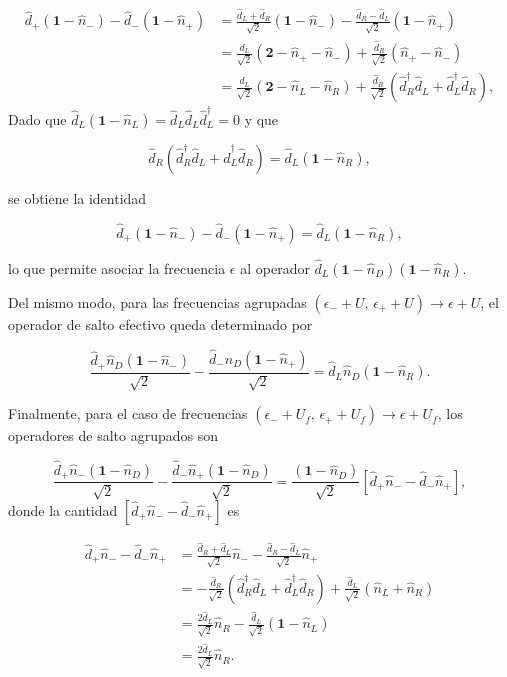 \begin{appendixs}
\begin{align*}
    \hat{d}_{+}(\textbf{1}-\hat{n}_{-}) - \hat{d}_{-}(\textbf{1}-\hat{n}_{+}) & = \frac{\hat{d}_{L} + \hat{d}_{R}}{\sqrt{2}} (\textbf{1} - \hat{n}_{-}) - \frac{\hat{d}_{R} - \hat{d}_{L}}{\sqrt{2}}(\textbf{1}-\hat{n}_{+}) \\
    & = \frac{\hat{d}_{L}}{\sqrt{2}}(\textbf{2} - \hat{n}_{+} -\hat{n}_{-} ) + \frac{\hat{d}_{R}}{\sqrt{2}}(\hat{n}_{+} -\hat{n}_{-}) \\
    & = \frac{\hat{d}_{L}}{\sqrt{2}}(\textbf{2}-\hat{n}_{L} -\hat{n}_{R}) + \frac{\hat{d}_{R}}{\sqrt{2}}(\hat{d}^{\dagger}_{R}\hat{d}_{L}+\hat{d}^{\dagger}_{L}\hat{d}_{R}),
\end{align*}
Dado que $\hat{d}_{L}(\mathbf{1} - \hat{n}_{L}) = \hat{d}_{L}\hat{d}_{L}\hat{d}^{\dagger}_{L} = 0$ y que 

\[
\hat{d}_{R}(\hat{d}^{\dagger}_{R}\hat{d}_{L} + \hat{d}^{\dagger}_{L}\hat{d}_{R}) = \hat{d}_{L}(\mathbf{1} - \hat{n}_{R}),
\]

se obtiene la identidad

\[
\hat{d}_{+}(\mathbf{1} - \hat{n}_{-}) - \hat{d}_{-}(\mathbf{1} - \hat{n}_{+}) = \hat{d}_{L}(\mathbf{1} - \hat{n}_{R}),
\]

lo que permite asociar la frecuencia $\epsilon$ al operador $\hat{d}_{L}(\mathbf{1} - \hat{n}_{D})(\mathbf{1} - \hat{n}_{R})$.

Del mismo modo, para las frecuencias agrupadas $(\epsilon_{-} + U,\, \epsilon_{+} + U) \to \epsilon + U$, el operador de salto efectivo queda determinado por

\[
\frac{\hat{d}_{+}\hat{n}_{D}(\mathbf{1} - \hat{n}_{-})}{\sqrt{2}} - \frac{\hat{d}_{-}\hat{n}_{D}(\mathbf{1} - \hat{n}_{+})}{\sqrt{2}} = \hat{d}_{L}\hat{n}_{D}(\mathbf{1} - \hat{n}_{R}).
\]

Finalmente, para el caso de frecuencias $(\epsilon_{-} + U_{f},\, \epsilon_{+} + U_{f}) \to \epsilon + U_{f}$, los operadores de salto agrupados son

\[
\frac{\hat{d}_{+}\hat{n}_{-}(\mathbf{1} - \hat{n}_{D})}{\sqrt{2}} - \frac{\hat{d}_{-}\hat{n}_{+}(\mathbf{1} - \hat{n}_{D})}{\sqrt{2}} = \frac{(\mathbf{1} - \hat{n}_{D})}{\sqrt{2}}\left[\hat{d}_{+}\hat{n}_{-} - \hat{d}_{-}\hat{n}_{+}\right],
\]
donde la cantidad $\left[\hat{d}_{+}\hat{n}_{-} - \hat{d}_{-}\hat{n}_{+}\right]$ es 

\begin{align*}
    \hat{d}_{+}\hat{n}_{-} -\hat{d}_{-}\hat{n}_{+} & = \frac{\hat{d}_{R}+\hat{d}_{L}}{\sqrt{2}}\hat{n}_{-} - \frac{\hat{d}_{R}-\hat{d}_{L}}{\sqrt{2}}\hat{n}_{+} \\
    & = - \frac{\hat{d}_{R}}{\sqrt{2}}(\hat{d}^{\dagger}_{R}\hat{d}_{L}+ \hat{d}^{\dagger}_{L}\hat{d}_{R}) + \frac{\hat{d}_{L}}{\sqrt{2}}(\hat{n}_{L}+\hat{n}_{R}) \\
    & = \frac{2\hat{d}_{L}}{\sqrt{2}}\hat{n}_{R} - \frac{\hat{d}_{L}}{\sqrt{2}}(\textbf{1}-\hat{n}_{L}) \\
    & = \frac{2\hat{d}_{L}}{\sqrt{2}}\hat{n}_{R}.
\end{align*}


\end{appendixs}
